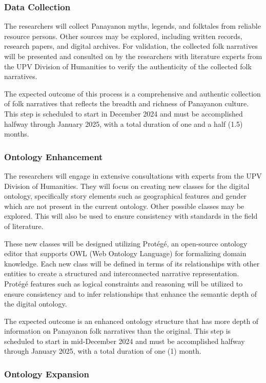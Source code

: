 \subsubsection{Data Collection} 
    The researchers will collect Panayanon myths, legends, and folktales from reliable resource persons. Other sources may be explored, including written records, research papers, and digital archives. For validation, the collected folk narratives will be presented and consulted on by the researchers with literature experts from the UPV Division of Humanities to verify the authenticity of the collected folk narratives. 
    
    The expected outcome of this process is a comprehensive and authentic collection of folk narratives that reflects the breadth and richness of Panayanon culture. This step is scheduled to start in December 2024 and must be accomplished halfway through January 2025, with a total duration of one and a half (1.5) months.
    
\subsubsection{Ontology Enhancement} 
    The researchers will engage in extensive consultations with experts from the UPV Division of Humanities. They will focus on creating new classes for the digital ontology,  specifically story elements such as geographical features and gender which are not present in the current ontology. Other possible classes may be explored. This will also be used to ensure consistency with standards in the field of literature.
    
    These new classes will be designed utilizing Protégé, an open-source ontology editor that supports OWL (Web Ontology Language) for formalizing domain knowledge. Each new class will be defined in terms of its relationships with other entities to create a structured and interconnected narrative representation. Protégé features such as logical constraints and reasoning will be utilized to ensure consistency and to infer relationships that enhance the semantic depth of the digital ontology.
    
    The expected outcome is an enhanced ontology structure that has more depth of information on Panayanon folk narratives than the original. This step is scheduled to start in mid-December 2024 and must be accomplished halfway through January 2025, with a total duration of one (1) month.

\subsubsection{Ontology Expansion}

